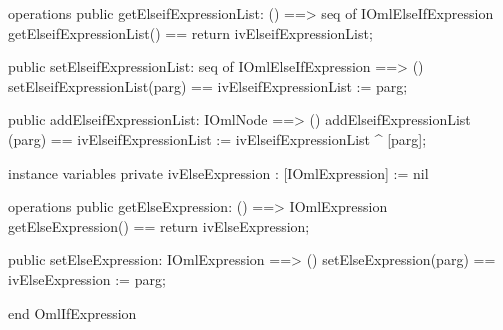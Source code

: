 \begin{vdm_al}
operations
  public getElseifExpressionList: () ==> seq of IOmlElseIfExpression
  getElseifExpressionList() == return ivElseifExpressionList;

  public setElseifExpressionList: seq of IOmlElseIfExpression ==> ()
  setElseifExpressionList(parg) == ivElseifExpressionList := parg;

  public addElseifExpressionList: IOmlNode ==> ()
  addElseifExpressionList (parg) == ivElseifExpressionList := ivElseifExpressionList ^ [parg];

instance variables
  private ivElseExpression : [IOmlExpression] := nil

operations
  public getElseExpression: () ==> IOmlExpression
  getElseExpression() == return ivElseExpression;

  public setElseExpression: IOmlExpression ==> ()
  setElseExpression(parg) == ivElseExpression := parg;

end OmlIfExpression
\end{vdm_al}

